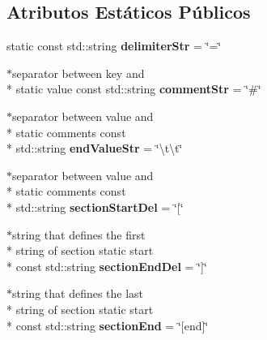 \subsection*{Atributos Estáticos Públicos}
\begin{DoxyCompactItemize}
\item 
\hypertarget{class_c_f_g_file_afcee852b462b487b7cef10b89f46d312}{static const std\-::string {\bfseries delimiter\-Str} = \char`\"{}=\char`\"{}}\label{class_c_f_g_file_afcee852b462b487b7cef10b89f46d312}

\item 
\hypertarget{class_c_f_g_file_a95d897cc39db40029d4e1494428fa0be}{$\ast$separator between key and \\*
static value const std\-::string {\bfseries comment\-Str} = \char`\"{}\#\char`\"{}}\label{class_c_f_g_file_a95d897cc39db40029d4e1494428fa0be}

\item 
\hypertarget{class_c_f_g_file_ae54f59bdb2c428e54ed52a435cc95a7e}{$\ast$separator between value and \\*
static comments const \\*
std\-::string {\bfseries end\-Value\-Str} = \char`\"{}\textbackslash{}t\textbackslash{}t\char`\"{}}\label{class_c_f_g_file_ae54f59bdb2c428e54ed52a435cc95a7e}

\item 
\hypertarget{class_c_f_g_file_a82bb28404291aec2d67c8ca2a3aeebe4}{$\ast$separator between value and \\*
static comments const \\*
std\-::string {\bfseries section\-Start\-Del} = \char`\"{}\mbox{[}\char`\"{}}\label{class_c_f_g_file_a82bb28404291aec2d67c8ca2a3aeebe4}

\item 
\hypertarget{class_c_f_g_file_a994e75153c582ce158456d5f9a4ce9db}{$\ast$string that defines the first \\*
string of section static start \\*
const std\-::string {\bfseries section\-End\-Del} = \char`\"{}\mbox{]}\char`\"{}}\label{class_c_f_g_file_a994e75153c582ce158456d5f9a4ce9db}

\item 
\hypertarget{class_c_f_g_file_a33375621a07cb3ca70ebb49757377545}{$\ast$string that defines the last \\*
string of section static start \\*
const std\-::string {\bfseries section\-End} = \char`\"{}\mbox{[}end\mbox{]}\char`\"{}}\label{class_c_f_g_file_a33375621a07cb3ca70ebb49757377545}

\end{DoxyCompactItemize}


